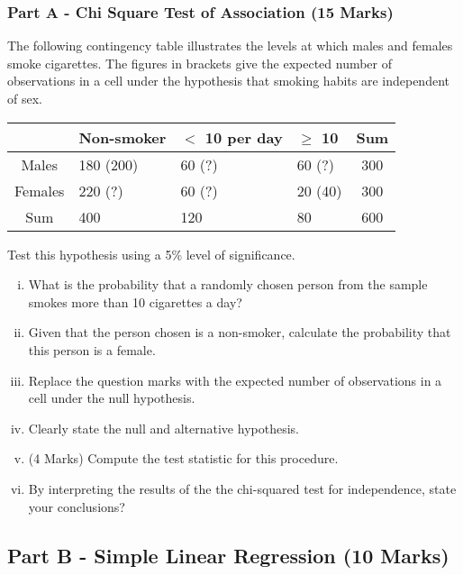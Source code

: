 \subsubsection*{Part A - Chi Square Test of Association (15 Marks)}
The following contingency table illustrates the levels at which males and females smoke cigarettes. The figures in brackets give the expected number of observations in a cell under the hypothesis that smoking habits are independent of sex.

{

	\begin{center}
		\begin{tabular}{|c||l|l|l||c|}
			\hline
			& Non-smoker&  $<$ 10 per day &  $\geq $ 10  & \phantom{sp}Sum\phantom{sp} \\ \hline
			
			Males & 180\phantom{spa} (200)&  60\phantom{spa} (?) & 60 \phantom{spa} (?) & 300\\ \hline
			
			Females & 220\phantom{spa} (?) & 60 \phantom{spa}(?)& 20 \phantom{spa} (40) & 300\\ \hline \hline
			
			Sum & 400 & 120 & 80& 600\\ \hline
		\end{tabular} 
	\end{center}
	\phantom{spa}
}
\medskip
Test this hypothesis using a 5\% level of significance. 

\begin{enumerate}[(i)]
\item  What is the probability that a randomly chosen person from the sample smokes more than 10 cigarettes a day? %

\item  Given that the person chosen is a non-smoker, calculate the probability that this person is a female. %

\item  Replace the question marks with the expected number of observations in a cell under the null hypothesis. %
\item  Clearly state the null and alternative hypothesis.
\item (4 Marks) Compute the test statistic for this procedure.
\item  By interpreting the results of the the chi-squared test for independence, state your conclusions? %
\end{enumerate}
\subsection*{Part B - Simple Linear Regression (10 Marks)}


